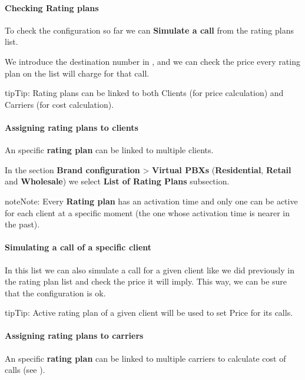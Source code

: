 \documentclass[letterpaper,10pt,english]{sphinxmanual}
\begin{document}
\paragraph{Checking Rating plans}

To check the configuration so far we can \textbf{Simulate a call} from the rating plans list.

We introduce the destination number in {\hyperref[administration_portal/brand/settings/numeric_transformations:e164]{}}, and we can check the price every rating plan on the
list will charge for that call.

\begin{notice}{tip}{Tip:}
Rating plans can be linked to both Clients (for price calculation) and Carriers (for cost calculation).
\end{notice}


\paragraph{Assigning rating plans to clients}
\label{administration_portal/brand/billing/rating_plans:assigning-rating-plans-to-clients}
An specific \textbf{rating plan} can be linked to multiple clients.

In the section \textbf{Brand configuration} \textgreater{} \textbf{Virtual PBXs} (\textbf{Residential}, \textbf{Retail} and \textbf{Wholesale}) we select
\textbf{List of Rating Plans} subsection.

\begin{notice}{note}{Note:}
Every \textbf{Rating plan} has an activation time and only one can be active for each
client at a specific moment (the one whose activation time is nearer in the past).
\end{notice}
\paragraph{Simulating a call of a specific client}

In this list we can also simulate a call for a given client like we did previously
in the rating plan list and check the price it will imply. This way, we can be sure
that the configuration is ok.

\begin{notice}{tip}{Tip:}
Active rating plan of a given client will be used to set Price for its calls.
\end{notice}


\paragraph{Assigning rating plans to carriers}
\label{administration_portal/brand/billing/rating_plans:assigning-rating-plans-to-carriers}
An specific \textbf{rating plan} can be linked to multiple carriers to calculate cost of calls (see {\hyperref[administration_portal/brand/providers/carriers:cost\string-calculation]{}}).
\end{document}
